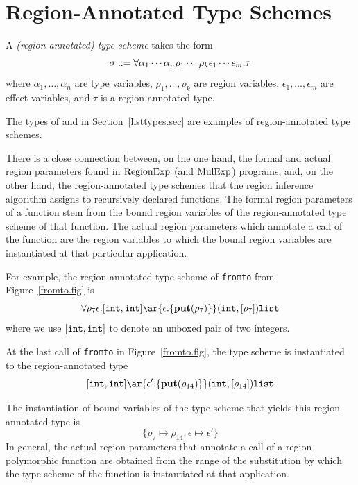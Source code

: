\documentclass[12pt]{book}
\begin{document}
\section{Region-Annotated Type Schemes}
\label{regtych.sec}
A 
%
%
{\em (region-annotated) type scheme\/} takes the form
$$\sigma::=\forall\alpha_1\cdots\alpha_n\rho_1\cdots\rho_k\epsilon_1\cdots\epsilon_m.\tau$$
where $\alpha_1,\ldots,\alpha_n$ are type variables,
$\rho_1,\ldots,\rho_k$ are region variables,
$\epsilon_1,\ldots,\epsilon_m$ are 
%
effect variables, and $\tau$ is a region-annotated type.

The types of  and \boxml{::} in Section~\ref{listtypes.sec} are examples of 
%
region-annotated type schemes. 

There is a close connection between, on the one hand, the formal and
actual 
%
region parameters found in $\hbox{\rm RegionExp}$ (and $\hbox{\rm MulExp}$) programs, and, on
the other hand, the region-annotated type schemes that the region inference
algorithm assigns to recursively declared functions. The formal region
parameters of a function stem from the bound region variables of the
region-annotated type scheme of that function.  The actual region parameters
which annotate a call of the function are the region variables to
which the bound region variables are instantiated at that particular
application.

For example, the region-annotated type scheme of {\tt fromto} from
Figure~\ref{fromto.fig} is
$$\forall\rho_7\epsilon. [\boxml{int}, \boxml{int} ]
\ar{\epsilon.\{\Put(\rho_7)\}} (\boxml{int},[\rho_7])\boxml{list}$$
where we use $[\hbox{\tt int}, \hbox{\tt int}]$ to denote an unboxed pair of
two integers.

At the last call of {\tt fromto} in Figure~\ref{fromto.fig},
the type scheme is instantiated to the region-annotated type
$$[\boxml{int}, \boxml{int}] \ar{\epsilon'.\{\Put(\rho_{14})\}}
(\boxml{int},[\rho_{14}])\boxml{list}$$

The instantiation of bound variables of the type scheme that yields
this region-annotated type is
$$\{\rho_7\mapsto\rho_{14}, \epsilon\mapsto\epsilon'\}$$
In general,
the actual region parameters that annotate a call of a
region-polymorphic function are obtained from the range of the
substitution by which the type scheme of the function is instantiated
at that application.
\end{document}
